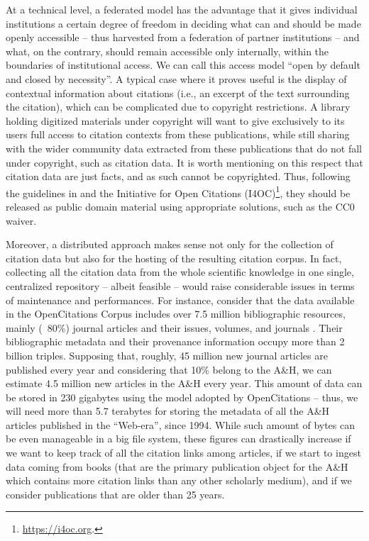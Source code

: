 At a technical level, a federated model has the advantage that it gives individual institutions a certain degree of freedom in deciding what can and should be made openly accessible -- thus harvested from a federation of partner institutions -- and what, on the contrary, should remain accessible only internally, within the boundaries of institutional access. We can call this access model ``open by default and closed by necessity''. A typical case where it proves useful is the display of contextual information about citations (i.e., an excerpt of the text surrounding the citation), which can be complicated due to copyright restrictions. A library holding digitized materials under copyright will want to give exclusively to its users full access to citation contexts from these publications, while still sharing with the wider community data extracted from these publications that do not fall under copyright, such as citation data. It is worth mentioning on this respect that citation data are just facts, and as such cannot be copyrighted. Thus, following the guidelines in \cite{peroni_open_2018} and the Initiative for Open Citations (I4OC)\footnote{\url{https://i4oc.org}.}, they should be released as public domain material using appropriate solutions, such as the CC0 waiver.

Moreover, a distributed approach makes sense not only for the collection of citation data but also for the hosting of the resulting citation corpus. In fact, collecting all the citation data from the whole scientific knowledge in one single, centralized repository -- albeit feasible -- would raise considerable issues in terms of maintenance and performances. For instance, consider that the data available in the OpenCitations Corpus includes over 7.5 million bibliographic resources, mainly (~80\%) journal articles and their issues, volumes, and journals \cite{damato_one_2017}. Their bibliographic metadata and their provenance information occupy more than 2 billion triples. Supposing that, roughly, 45 million new journal articles are published every year \cite{van_harmelen_end_2017} and considering that 10\% belong to the A\&H, we can estimate 4.5 million new articles in the A\&H every year. This amount of data can be stored in 230 gigabytes using the model adopted by OpenCitations -- thus, we will need more than 5.7 terabytes for storing the metadata of all the A\&H articles published in the ``Web-era'', since 1994. While such amount of bytes can be even manageable in a big file system, these figures can drastically increase if we want to keep track of all the citation links among articles, if we start to ingest data coming from books (that are the primary publication object for the A\&H which contains more citation links than any other scholarly medium), and if we consider publications that are older than 25 years. 

